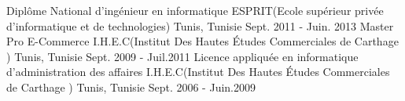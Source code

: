 \begin{cventries}
  \cventry
    {Diplôme National d'ingénieur en informatique}
    {ESPRIT(Ecole supérieur privée d'informatique et de technologies)}
    {Tunis, Tunisie}
    {Sept. 2011 - Juin. 2013}
    {
    }
  \cventry
    {Master Pro E-Commerce }
    {I.H.E.C(Institut Des Hautes Études Commerciales de Carthage )}
    {Tunis, Tunisie}
    {Sept. 2009 - Juil.2011}
    {
    }    
  \cventry
    {Licence appliquée en informatique d’administration des  affaires}
    {I.H.E.C(Institut Des Hautes Études Commerciales de Carthage )}
    {Tunis, Tunisie}
    {Sept. 2006 - Juin.2009}
    {
    }      
\end{cventries}
